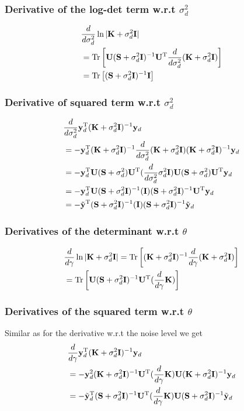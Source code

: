 \documentclass{article}
\newcommand{\B}[1]{{\bf{#1}}}
\newcommand\tr{\mathrm{Tr}}
\begin{document}
\subsubsection{Derivative of the log-det term w.r.t $\sigma_d^{2}$}
\begin{align}&
\dsd \ln | \bfK + \sigma^2_d\B{I} |  \\
&  =  \Tr \left [ \bfU ( \bfS + \sigma_d^2\B{I})^{-1} \bfU^{\T} \dsd
  (\bfK + \sigma_d^2 \B{I})\right]\\
& =  \Tr \left [ (\bfS + \sigma_d^{2} \unit)^{-1} \unit \right ]
\end{align}

\subsubsection{Derivative of squared term w.r.t $\sigma_d^{2}$}
\begin{align}&
\frac{{d}}{{d }\sigma^2_d} {\bf y}_d^{{\rm T}} ({\bf K} + \sigma_d^{2} {\bf I})^{-1} {\bf y}_d\\&
=- {\bf y}_d^{{\rm T}} ({\bf K} + \sigma_d^{2} {\bf I})^{-1} \frac{{d}}{{d }\sigma^2_d} ({\bf K} +
\sigma_d^{2} {\bf I}) ({\bf K} + \sigma_d^{2} {\bf I})^{-1} {\bf y}_d\\ &
=- {\bf y}_d^{{\rm T}} {\bf U} ( {\bf S} + \sigma_d^{2} ) {\bf U}^{{\rm T}} (\frac{{d}}{{d }\sigma^2_d}
\sigma_d^{2} {\bf I}) {\bf U} ({\bf S} + \sigma_d^{2}) {\bf U}^{{\rm T}} {\bf y}_d\\&
=- {\bf y}_d^{{\rm T}} {\bf U} ({\bf S} + \sigma_d^{2} {\bf I})^{-1} ({\bf I}) ({\bf S} +
\sigma_d^{2} {\bf I})^{-1} {\bf U}^{{\rm T}} {\bf y}_d \\&
= - \tilde{{\bf y}}^{{\rm T}}  ({\bf S} + \sigma_d^{2} {\bf I})^{-1} ({\bf I}) ({\bf S} +
\sigma_d^{2} {\bf I})^{-1} \tilde{{\bf y}}_d 
\end{align}

\subsubsection{Derivatives of the determinant w.r.t $\theta$}

\begin{align}&
\dg \ln | \bfK + \sigma_d^{2} \unit| = \tr \left [ (\bfK +
  \sigma_d^{2} \unit)^{-1} \dg (\bfK + \sigma_d^{2} \unit) \right ]
\\&
=\tr \left [  \bfU (\bfS + \sigma_d^{2} \unit)^{-1} \bfU^{\T}  (\dg \bfK) \right ]
\end{align}


\subsubsection{Derivatives of the squared term w.r.t $\theta$}
Similar as for the derivative w.r.t the noise level we get
\begin{align}&
\frac{{d}}{{d }\gamma} {\bf y}_d^{{\rm T}} ({\bf K} + \sigma_d^{2} {\bf I})^{-1} {\bf y}_d \\ &
= - {\bf y}_d^{2} ({\bf K} + \sigma_d^{2} {\bf I})^{-1} {\bf U}^{{\rm T}} (\frac{{d}}{{d }\gamma} {\bf K}) {\bf U} ({\bf K} +
\sigma_d^{2} {\bf I})^{-1} {\bf y}_d\\ &
= -\tilde{{\bf y}}_d^{{\rm T}} ({\bf S}+ \sigma_d^{2} {\bf I})^{-1} {\bf U}^{{\rm T}} (\frac{{d}}{{d }\gamma} {\bf K}) {\bf U} ({\bf S} +
\sigma_d^{2} {\bf I})^{-1} \tilde{{\bf y}}_d
\end{align}



\newpage
\end{document}
